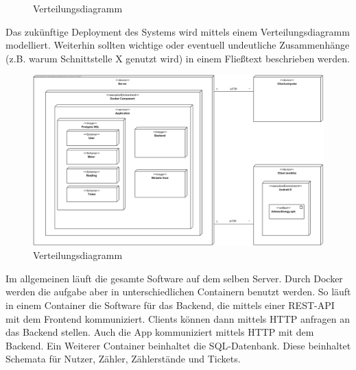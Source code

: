 \begin{figure}[h]
	\centering
	\caption{Verteilungsdiagramm}
	\label{fig:verteilungsdiagramm}
\end{figure}

\begin{tcolorbox}
	Das zukünftige Deployment des Systems wird mittels einem Verteilungsdiagramm modelliert.
	Weiterhin sollten wichtige oder eventuell undeutliche Zusammenhänge (z.B. warum Schnittstelle X genutzt wird) in einem Fließtext beschrieben werden.
\end{tcolorbox}

\begin{figure}[H]
	\centering
	\caption{Verteilungsdiagramm}
	\includegraphics[width=16cm]{img/diagrams/DeploymentDiagram}
\end{figure}
Im allgemeinen läuft die gesamte Software auf dem selben Server. Durch Docker werden die aufgabe aber in unterschiedlichen Containern benutzt werden.
So läuft in einem Container die Software für das Backend, die mittels einer REST-API mit dem Frontend kommuniziert. Clients können dann mittels HTTP anfragen an
das Backend stellen. Auch die App kommuniziert mittels HTTP mit dem Backend.
Ein Weiterer Container beinhaltet die SQL-Datenbank. Diese beinhaltet Schemata für Nutzer, Zähler, Zählerstände und Tickets.